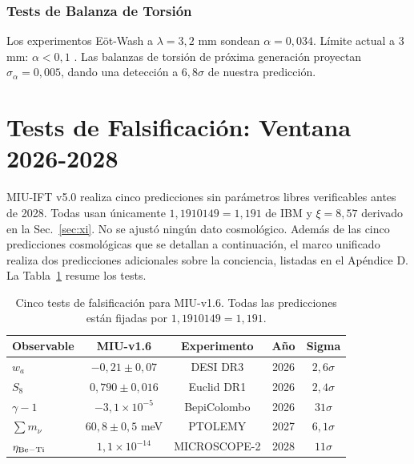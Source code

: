 \documentclass[12pt, a4paper]{article}
\theoremstyle{miuThm}
\theoremstyle{remark}
\newcommand{\qborn}{1{,}1910149}
\begin{document}
\subsubsection{Tests de Balanza de Torsión}
Los experimentos Eöt-Wash a $\lambda = 3{,}2$ mm sondean $\alpha = 0{,}034$.
Límite actual a 3 mm: $\alpha < 0{,}1$ \cite{Lee2020}. Las balanzas de torsión
de próxima generación proyectan $\sigma_\alpha = 0{,}005$, dando una detección a
$6{,}8\sigma$ de nuestra predicción.

\section{Tests de Falsificación: Ventana 2026-2028}
\label{sec:tests}

MIU-IFT v5.0 realiza cinco predicciones sin parámetros libres verificables antes
de 2028. Todas usan únicamente $\qborn = 1{,}191$ de IBM y $\xi = 8{,}57$
derivado en la Sec.~\ref{sec:xi}. No se ajustó ningún dato cosmológico. Además de las cinco predicciones cosmológicas que se detallan a continuación, el marco unificado realiza dos predicciones adicionales sobre la conciencia, listadas en el Apéndice D.
La Tabla~\ref{tab:tests} resume los tests.

\begin{table}[h!]
\centering
\caption{Cinco tests de falsificación para MIU-v1.6. Todas las predicciones están fijadas por $\qborn = 1{,}191$.}
\label{tab:tests}
\begin{tabular}{lcccc}
\toprule
\textbf{Observable} & \textbf{MIU-v1.6} & \textbf{Experimento} & \textbf{Año} & \textbf{Sigma} \\
\midrule
$w_a$ & $-0{,}21 \pm 0{,}07$ & DESI DR3 & 2026 & $2{,}6\sigma$ \\
$S_8$ & $0{,}790 \pm 0{,}016$ & Euclid DR1 & 2026 & $2{,}4\sigma$ \\
$\gamma-1$ & $-3{,}1\times10^{-5}$ & BepiColombo & 2026 & $31\sigma$ \\
$\sum m_\nu$ & $60{,}8 \pm 0{,}5$ meV & PTOLEMY & 2027 & $6{,}1\sigma$ \\
$\eta_{\rm Be-Ti}$ & $1{,}1\times10^{-14}$ & MICROSCOPE-2 & 2028 & $11\sigma$ \\
\bottomrule
\end{tabular}
\end{table}
\end{document}
